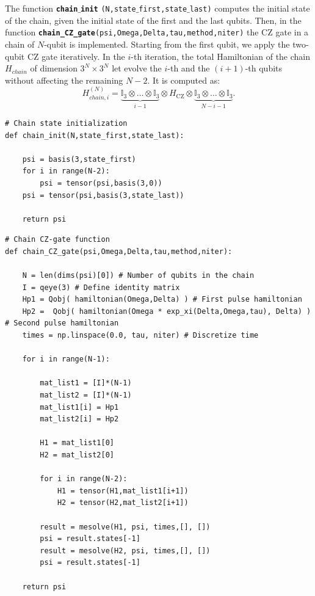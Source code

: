 \documentclass[rmp,10pt,onecolumn,fleqn,notitlepage]{revtex4-1}
\begin{document}
The function {\bfseries\texttt{chain$\_$init}} \texttt{(N,state$\_$first,state$\_$last)} computes the initial state of the chain, given the initial state of the first and the last qubits. Then, in the function {\bfseries\texttt{chain\_CZ\_gate}}\texttt{(psi,Omega,Delta,tau,method,niter)} the CZ gate in a chain of $N$-qubit is implemented. 
Starting from the first qubit, we apply the two-qubit CZ gate iteratively. In the $i$-th iteration, the total Hamiltonian of the chain $H_{chain}$ of dimension $3^N\times 3^N$ let evolve the $i$-th and the $(i+1)$-th qubits without affecting the remaining $N-2$. It is computed as:
\begin{equation}
    H_{chain,i}^{(N)} =  \underbrace{\mathbb{I}_3  \otimes \dots \otimes \mathbb{I}_3}_{i-1} \otimes H_{\text{CZ}} \otimes \underbrace{ \mathbb{I}_3  \otimes \dots \otimes \mathbb{I}_3}_{N-i-1}.
\end{equation}

\begin{lstlisting}[style=myPython]
# Chain state initialization
def chain_init(N,state_first,state_last):
    
    psi = basis(3,state_first) 
    for i in range(N-2):
        psi = tensor(psi,basis(3,0))
    psi = tensor(psi,basis(3,state_last))

    return psi
\end{lstlisting}

\begin{lstlisting}[style=myPython]
# Chain CZ-gate function
def chain_CZ_gate(psi,Omega,Delta,tau,method,niter):

    N = len(dims(psi)[0]) # Number of qubits in the chain
    I = qeye(3) # Define identity matrix
    Hp1 = Qobj( hamiltonian(Omega,Delta) ) # First pulse hamiltonian
    Hp2 =  Qobj( hamiltonian(Omega * exp_xi(Delta,Omega,tau), Delta) ) # Second pulse hamiltonian 
    times = np.linspace(0.0, tau, niter) # Discretize time
        
    for i in range(N-1):
        
        mat_list1 = [I]*(N-1)
        mat_list2 = [I]*(N-1)
        mat_list1[i] = Hp1
        mat_list2[i] = Hp2
        
        H1 = mat_list1[0]
        H2 = mat_list2[0]
        
        for i in range(N-2):
            H1 = tensor(H1,mat_list1[i+1])
            H2 = tensor(H2,mat_list2[i+1])
        
        result = mesolve(H1, psi, times,[], [])
        psi = result.states[-1]
        result = mesolve(H2, psi, times,[], [])
        psi = result.states[-1]
    
    return psi
\end{lstlisting}
\end{document}
